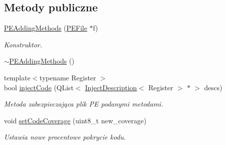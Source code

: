 \subsection*{Metody publiczne}
\begin{DoxyCompactItemize}
\item 
\hyperlink{class_p_e_adding_methods_a1cec9b94a430984c6d88386884ad0cdd}{P\-E\-Adding\-Methods} (\hyperlink{class_p_e_file}{P\-E\-File} $\ast$f)
\begin{DoxyCompactList}\small\item\em Konstruktor. \end{DoxyCompactList}\item 
\hyperlink{class_p_e_adding_methods_a6f0a7a7d04944167192c61e22b4f04ee}{$\sim$\-P\-E\-Adding\-Methods} ()
\item 
{\footnotesize template$<$typename Register $>$ }\\bool \hyperlink{class_p_e_adding_methods_a2b224b51233e0446621e9daf9108e78b}{inject\-Code} (Q\-List$<$ \hyperlink{class_d_adding_methods_1_1_inject_description}{Inject\-Description}$<$ Register $>$ $\ast$ $>$ descs)
\begin{DoxyCompactList}\small\item\em Metoda zabezpieczająca plik P\-E podanymi metodami. \end{DoxyCompactList}\item 
void \hyperlink{class_p_e_adding_methods_af7948de6504286fdee160acba2c811bf}{set\-Code\-Coverage} (uint8\-\_\-t new\-\_\-coverage)
\begin{DoxyCompactList}\small\item\em Ustawia nowe procentowe pokrycie kodu. \end{DoxyCompactList}\end{DoxyCompactItemize}
